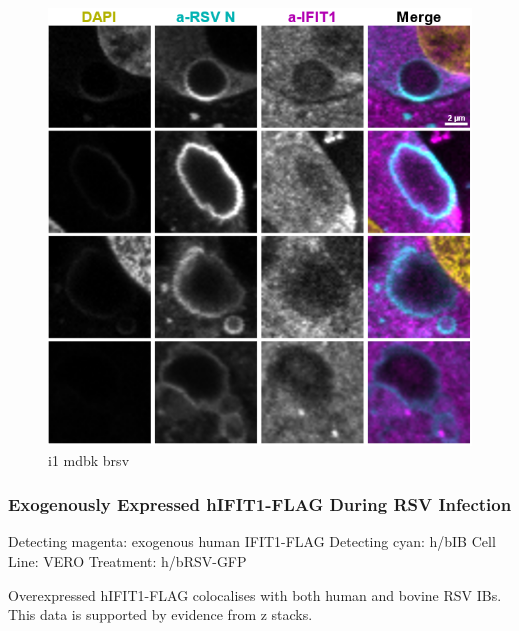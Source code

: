 \begin{figure}
    \centering
    \includegraphics[width=1\linewidth]{09. Chapter 4/Figs/03. IFIT1/06. mdbk brsv.png}
    \caption[i1 mdbk brsv]{i1 mdbk brsv}
    \label{fig:i1 mdbk brsv}
\end{figure}

\subsubsection{Exogenously Expressed hIFIT1-FLAG During RSV Infection} \label{Exogenously Expressed hIFIT1-FLAG During RSV Infection}
Detecting magenta: exogenous human IFIT1-FLAG \newline
Detecting cyan: h/bIB \newline
Cell Line: VERO \newline
Treatment: h/bRSV-GFP \newline

Overexpressed hIFIT1-FLAG colocalises with both human and bovine RSV IBs. This data is supported by evidence from z stacks.

